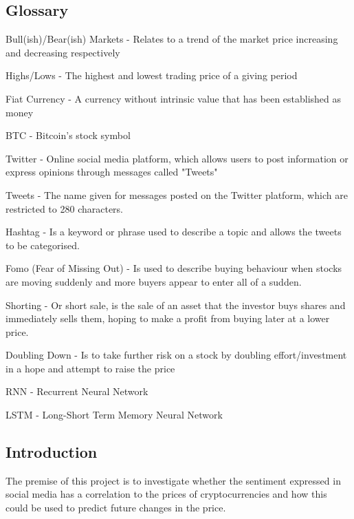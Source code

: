 \documentclass[oneside, 12pt]{article}
\begin{document}
	\newpage
	\begin{center}
		\section{Glossary}\label{glossary}
	\end{center}
	Bull(ish)/Bear(ish) Markets - Relates to a trend of the market price increasing and decreasing respectively
	
	Highs/Lows - The highest and lowest trading price of a giving period
	
	Fiat Currency - A currency without intrinsic value that has been established as money
	
	BTC - Bitcoin's stock symbol
	
	Twitter - Online social media platform, which allows users to post information or express opinions through messages called "Tweets"
	
	Tweets - The name given for messages posted on the Twitter platform, which are restricted to 280 characters.
	
	Hashtag - Is a keyword or phrase used to describe a topic and allows the tweets to be categorised.
	
	Fomo (Fear of Missing Out) - Is used to describe buying behaviour when stocks are moving suddenly and more buyers appear to enter all of a sudden.
	
	Shorting - Or short sale, is the sale of an asset that the investor buys shares and immediately sells them, hoping to make a profit from buying later at a lower price.
	
	Doubling Down - Is to take further risk on a stock by doubling effort/investment in a hope and attempt to raise the price
	
	RNN - Recurrent Neural Network
	
	LSTM - Long-Short Term Memory Neural Network
	
	\newpage
	
	\begin{center}
		\tableofcontents
	\end{center}
	
	\newpage
	\begin{center}
		\section{Introduction}\label{introduction}
	\end{center}
	The premise of this project is to investigate whether the sentiment expressed in social media has a correlation to the prices of cryptocurrencies and how this could be used to predict future changes in the price. 
	
\end{document}
